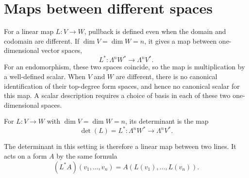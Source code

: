 \section{Maps between different spaces}
\label{sec:linear-algebra-i:determinants-between-spaces}

For a linear map \(L:V\to W\), pullback is defined even when the domain
and codomain are different. If \(\dim V=\dim W=n\), it gives a map
between one-dimensional vector spaces,
\[
  L^*:\Lambda^n W^*\longrightarrow\Lambda^n V^*.
\]
For an endomorphism, these two spaces coincide, so the map is multiplication
by a well-defined scalar. When \(V\) and \(W\) are different, there is no
canonical identification of their top-degree form spaces, and hence no
canonical scalar for this map. A scalar description requires a choice of
basis in each of these two one-dimensional spaces.

\begin{definition}
  For \(L:V\to W\) with \(\dim V=\dim W=n\), its determinant is
  the map
  \[
    \det(L)=L^*:\Lambda^n W^*\longrightarrow\Lambda^n V^*.
  \]
\end{definition}

The determinant in this setting is therefore a linear map between two
lines. It acts on a form \(A\) by the same formula
\[
  (L^*A)(v_1,\ldots,v_n)=A(L(v_1),\ldots,L(v_n)).
\]
